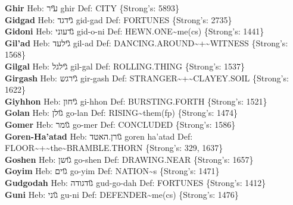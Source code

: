 {\textbf{Ghir} Heb: {\large\H עיר} ghir Def: CITY \{Strong's: 5893\}\hfill{}\\

\textbf{Gidgad} Heb: {\large\H גידגד} gid-gad Def: FORTUNES \{Strong's: 2735\}\hfill{}\\

\textbf{Gidoni} Heb: {\large\H גדעוני} gid-o-ni Def: HEWN.ONE\textasciitilde{}me(cs) \{Strong's: 1441\}\hfill{}\\

\textbf{Gil'ad} Heb: {\large\H גילעד} gil-ad Def: DANCING.AROUND\textasciitilde{}+\textasciitilde{}WITNESS \{Strong's: 1568\}\hfill{}\\

\textbf{Gilgal} Heb: {\large\H גילגל} gil-gal Def: ROLLING.THING \{Strong's: 1537\}\hfill{}\\

\textbf{Girgash} Heb: {\large\H גירגש} gir-gash Def: STRANGER\textasciitilde{}+\textasciitilde{}CLAYEY.SOIL \{Strong's: 1622\}\hfill{}\\

\textbf{Giyhhon} Heb: {\large\H גיחון} gi-hhon Def: BURSTING.FORTH \{Strong's: 1521\}\hfill{}\\

\textbf{Golan} Heb: {\large\H גולן} go-lan Def: RISING\textasciitilde{}them(fp) \{Strong's: 1474\}\hfill{}\\

\textbf{Gomer} Heb: {\large\H גומר} go-mer Def: CONCLUDED \{Strong's: 1586\}\hfill{}\\

\textbf{Goren-Ha'atad} Heb: {\large\H גורן.האטד} goren ha'atad Def: FLOOR\textasciitilde{}+\textasciitilde{}the\textasciitilde{}BRAMBLE.THORN \{Strong's: 329, 1637\}\hfill{}\\

\textbf{Goshen} Heb: {\large\H גושן} go-shen Def: DRAWING.NEAR \{Strong's: 1657\}\hfill{}\\

\textbf{Goyim} Heb: {\large\H גוים} go-yim Def: NATION\textasciitilde{}s \{Strong's: 1471\}\hfill{}\\

\textbf{Gudgodah} Heb: {\large\H גודגודה} gud-go-dah Def: FORTUNES \{Strong's: 1412\}\hfill{}\\

\textbf{Guni} Heb: {\large\H גוני} gu-ni Def: DEFENDER\textasciitilde{}me(cs) \{Strong's: 1476\}\hfill{}\\

}
